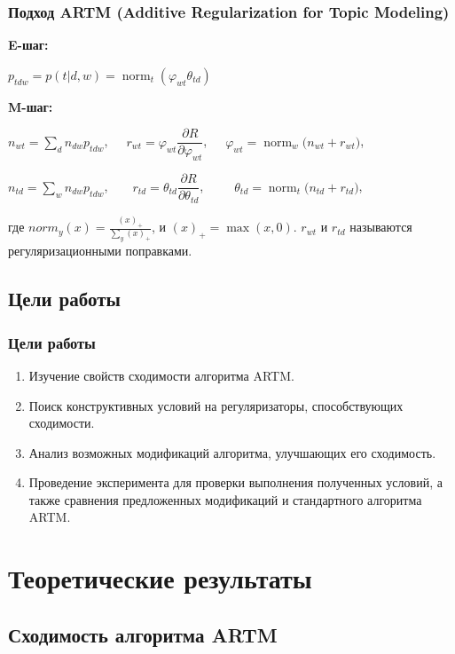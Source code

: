 \documentclass[utf8]{beamer}
\DeclareMathOperator{\norm}{norm}
\renewcommand{\phi}{\varphi}
\begin{document}
 	\begin{frame}
		\frametitle{Подход ARTM (Additive Regularization for Topic Modeling)}   
   		\textbf{E-шаг:}	
   		 
   		 \qquad $p_{tdw} = p(t|d, w) = \norm_t(\varphi_{wt} \theta_{td})$ 		 
 		\medskip
 		
 		\textbf{M-шаг:}
    
 		\qquad $n_{wt} = \sum\limits_{d} n_{dw} p_{tdw}$,\ \ \ $r_{wt} =  \phi_{wt}\dfrac{\partial R}{\partial\phi_{wt}}$,\ \ \  $\phi_{wt}   = \norm_w\big(n_{wt} + r_{wt}\big)$,

 		\qquad $n_{td} = \sum\limits_{w} n_{dw} p_{tdw}$,\ \ \  \ $r_{td} =  \theta_{td}\dfrac{\partial R}{\partial\theta_{td}}$,\ \ \ \ \ $\theta_{td} = \norm_t  \big(n_{td} + r_{td}\big)$,
\medskip

	где $norm_y(x) = \frac{(x)_{+}}{\sum\limits_y (x)_{+}}$, и $(x)_{+} = \max(x, 0)$. $r_{wt}$ и $r_{td}$ называются регуляризационными поправками. 
	\end{frame}
	
	\subsection{Цели работы}	
	\begin{frame}
		\frametitle{Цели работы}
		\begin{enumerate}
			\item Изучение свойств сходимости алгоритма ARTM. 
			\item Поиск конструктивных условий на регуляризаторы, способствующих сходимости.
			\item Анализ возможных модификаций алгоритма, улучшающих его сходимость.
			\item Проведение эксперимента для проверки выполнения полученных условий, а также сравнения предложенных модификаций и стандартного алгоритма ARTM.
		\end{enumerate}
	\end{frame}


	\section{Теоретические результаты}
	\subsection{Сходимость алгоритма ARTM}
	
\end{document}
